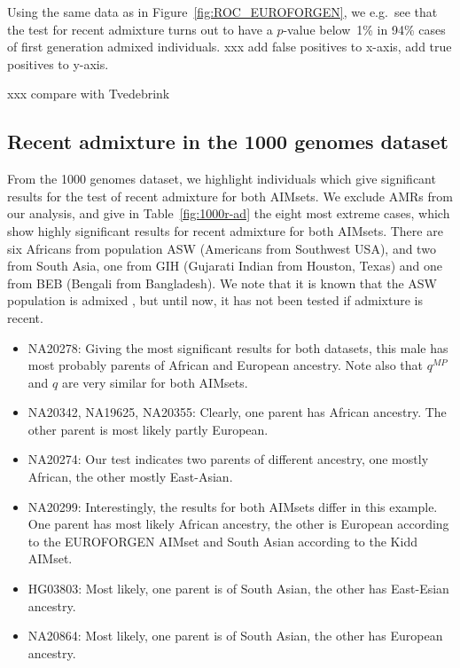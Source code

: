 \documentclass[12pt]{article}
\theoremstyle{definition}
\begin{document}
\begin{table}
  \centering
  
  \caption{Using the same data as in Figure~\ref{fig:ROC_EUROFORGEN},
    we e.g.\ see that the test for recent admixture turns out to have
    a $p$-value below~1\% in 94\% cases of first generation admixed
    individuals. xxx add false positives to x-axis, add true positives
    to y-axis.}
  \label{tab:power}
\end{table}

xxx compare with Tvedebrink

\subsection{Recent admixture in the 1000 genomes dataset}
From the 1000 genomes dataset, we highlight individuals which give
significant results for the test of recent admixture for both
AIMsets. We exclude AMRs from our analysis, and give in
Table~\ref{fig:1000r-ad} the eight most extreme cases, which show
highly significant results for recent admixture for both
AIMsets. There are six Africans from population ASW (Americans from
Southwest USA), and two from South Asia, one from GIH (Gujarati Indian
from Houston, Texas) and one from BEB (Bengali from Bangladesh). We
note that it is known that the ASW population is admixed
\cite{Eduardoff2016}, but until now, it has not been tested if
admixture is recent.

\begin{itemize}
\item NA20278: Giving the most significant results for both datasets,
  this male has most probably parents of African and European
  ancestry. Note also that $q^{MP}$ and $q$ are very similar for both
  AIMsets.
\item NA20342, NA19625, NA20355: Clearly, one parent has African
  ancestry. The other parent is most likely partly European.
\item NA20274: Our test indicates two parents of different ancestry,
  one mostly African, the other mostly East-Asian.
\item NA20299: Interestingly, the results for both AIMsets differ in
  this example. One parent has most likely African ancestry, the other
  is European according to the EUROFORGEN AIMset and South Asian
  according to the Kidd AIMset.
\item HG03803: Most likely, one parent is of South Asian, the other
  has East-Esian ancestry.
\item NA20864: Most likely, one parent is of South Asian, the other
  has European ancestry.
\end{itemize}
\end{document}
